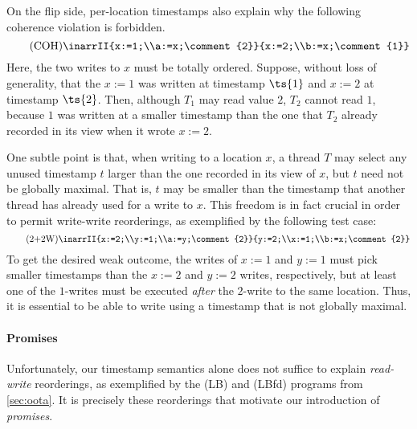 On the flip side, per-location timestamps also explain why the following coherence
violation is forbidden.
\begin{equation}\label{eq:COH}\tag{COH}
\inarrII{x:=1;\\a:=x;\comment{2}}{x:=2;\\b:=x;\comment{1}}
\end{equation}
Here, the two writes to $x$ must be totally ordered.  Suppose, without
loss of generality, that the $x:=1$ was written at timestamp $\ts{1}$ and
$x:=2$ at timestamp $\ts{2}$.  Then, although $T_1$ may read value $2$,
$T_2$ cannot read $1$, because $1$ was written at a smaller timestamp
than the one that $T_2$ already recorded in its view when it wrote $x:=2$.


One subtle point is that, when writing to a location $x$, a
thread $T$ may select any unused timestamp $t$ larger than the one
recorded in its view of $x$, but $t$ need not be globally maximal.
That is, $t$ may be smaller than the timestamp that another thread has
already used for a write to $x$.  %
This freedom is in fact crucial in order to permit write-write reorderings, as
exemplified by the following test case:
\begin{equation}\label{eq:2+2W}\tag{2+2W}
\inarrII{x:=2;\\y:=1;\\a:=y;\comment{2}}{y:=2;\\x:=1;\\b:=x;\comment{2}}
\end{equation}
To get the desired weak outcome, the writes of $x:=1$ and $y:=1$ must
pick smaller timestamps than the $x:=2$ and $y:=2$ writes,
respectively, but at least one of the $1$-writes must be executed
\emph{after} the $2$-write to the same location.  Thus, it is essential
to be able to write using a timestamp that is not globally maximal.

\paragraph{Promises}

Unfortunately, our timestamp semantics alone does not suffice
to explain \emph{read-write} reorderings, as exemplified by the (LB)
and (LBfd) programs from \cref{sec:oota}.  It is precisely these
reorderings that motivate our introduction of \emph{promises}.

